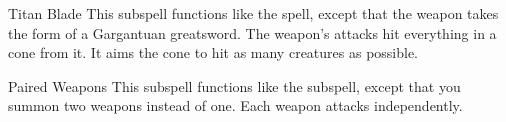 \begin{ability}[\nth{6}]{Titan Blade}
This subspell functions like the  spell, except that the weapon takes the form of a Gargantuan greatsword.
The weapon's attacks hit everything in a \areamed cone from it.
It aims the cone to hit as many creatures as possible.
\end{ability}
\vspace{0.25em}



\begin{ability}[\nth{7}]{Paired Weapons}
This subspell functions like the  subspell, except that you summon two weapons instead of one.
Each weapon attacks independently.
\end{ability}
\vspace{0.25em}

